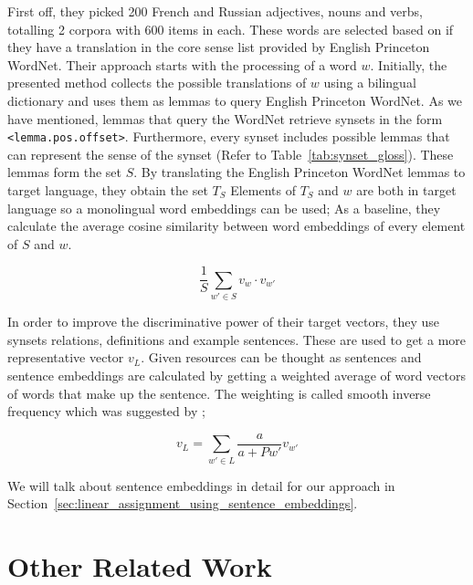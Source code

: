 First off, they picked 200 French and Russian adjectives, nouns and verbs, totalling 2 corpora with 600 items in each.
These words are selected based on if they have a translation in the core sense list provided by English Princeton WordNet.
Their approach starts with the processing of a word $w$.
Initially, the presented method collects the possible translations of $w$ using a bilingual dictionary and uses them as lemmas to query English Princeton WordNet.
As we have mentioned, lemmas that query the WordNet retrieve synsets in the form \texttt{<lemma.pos.offset>}.
Furthermore, every synset includes possible lemmas that can represent the sense of the synset (Refer to Table~\ref{tab:synset_gloss}).
These lemmas form the set $S$.
By translating the English Princeton WordNet lemmas to target language, they obtain the set $T_S$
Elements of $T_S$ and $w$ are both in target language so a monolingual word embeddings can be used;
As a baseline, they calculate the average cosine similarity between word embeddings of every element of $S$ and $w$.

\begin{displaymath}
    \frac{1}{S}\sum_{w' \in S}v_{w} \cdot v_{w'}
\end{displaymath}

In order to improve the discriminative power of their target vectors, they use synsets relations, definitions and example sentences.
These are used to get a more representative vector $v_{L}$.
Given resources can be thought as sentences and sentence embeddings are calculated by getting a weighted average of word vectors of words that make up the sentence.
The weighting is called smooth inverse frequency which was suggested by \textcite{aroraSimple2016};

\begin{displaymath}
    v_{L} = \sum_{w' \in L}\frac{a}{a + P{w'}}v_{w'}
\end{displaymath}

We will talk about sentence embeddings in detail for our approach in Section~\ref{sec:linear_assignment_using_sentence_embeddings}.

\section{Other Related Work}%
\label{sec:other_related_work}

